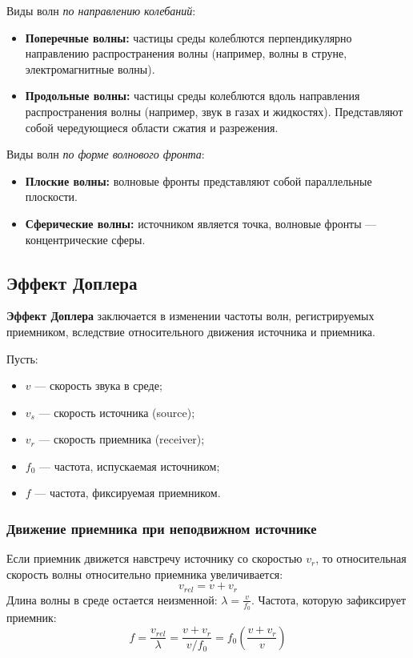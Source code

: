Виды волн \textit{по направлению колебаний}:
\begin{itemize}
    \item \textbf{Поперечные волны:} частицы среды колеблются перпендикулярно направлению распространения волны (например, волны в струне, электромагнитные волны).
    \item \textbf{Продольные волны:} частицы среды колеблются вдоль направления распространения волны (например, звук в газах и жидкостях). Представляют собой чередующиеся области сжатия и разрежения.
\end{itemize}

Виды волн \textit{по форме волнового фронта}:
\begin{itemize}
    \item \textbf{Плоские волны:} волновые фронты представляют собой параллельные плоскости.
    \item \textbf{Сферические волны:} источником является точка, волновые фронты — концентрические сферы.
\end{itemize}

\subsection{Эффект Доплера}

\textbf{Эффект Доплера} заключается в изменении частоты волн, регистрируемых приемником, вследствие относительного движения источника и приемника.

Пусть:
\begin{itemize}
    \item $v$ --- скорость звука в среде;
    \item $v_s$ --- скорость источника (source);
    \item $v_r$ --- скорость приемника (receiver);
    \item $f_0$ --- частота, испускаемая источником;
    \item $f$ --- частота, фиксируемая приемником.
\end{itemize}

\subsubsection{Движение приемника при неподвижном источнике}

Если приемник движется навстречу источнику со скоростью $v_r$, то относительная скорость волны относительно приемника увеличивается:
\[
v_{rel} = v + v_r
\]
Длина волны в среде остается неизменной: $\lambda = \frac{v}{f_0}$. Частота, которую зафиксирует приемник:
\[
f = \frac{v_{rel}}{\lambda} = \frac{v + v_r}{v / f_0} = f_0 \left( \frac{v + v_r}{v} \right)
\]

